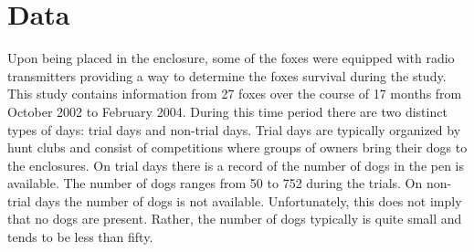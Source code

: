 \documentclass[aoas,preprint]{imsart}
\numberwithin{equation}{section}
\theoremstyle{plain}
\begin{document}
\section{Data} Upon being placed in the enclosure, some of the foxes were equipped with radio transmitters providing a way to determine the foxes survival during the study. This study contains information from 27 foxes over the course of 17 months from October 2002 to February 2004. During this time period there are two distinct types of days: trial days and non-trial days. Trial days are typically organized by hunt clubs and consist of competitions where groups of owners bring their dogs to the enclosures. On trial days there is a record of the number of dogs in the pen is available. The number of dogs ranges from 50 to 752 during the trials. On non-trial days the number of dogs is not available. Unfortunately, this does not imply that no dogs are present. Rather, the number of dogs typically is quite small and tends to be less than fifty.
\end{document}
